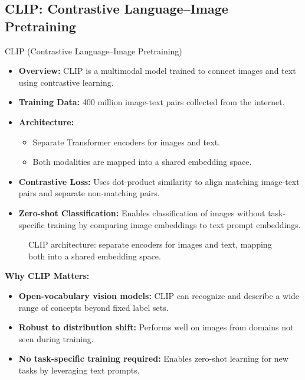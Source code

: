 \subsection{CLIP: Contrastive Language–Image Pretraining}
\begin{frame}[allowframebreaks]{CLIP (Contrastive Language–Image Pretraining)}
    \begin{itemize}
        \item \textbf{Overview:} CLIP is a multimodal model trained to connect images and text using contrastive learning.
        \item \textbf{Training Data:} 400 million image-text pairs collected from the internet.
        \item \textbf{Architecture:}
        \begin{itemize}
            \item Separate Transformer encoders for images and text.
            \item Both modalities are mapped into a shared embedding space.
        \end{itemize}
        \item \textbf{Contrastive Loss:} Uses dot-product similarity to align matching image-text pairs and separate non-matching pairs.
        \item \textbf{Zero-shot Classification:} Enables classification of images without task-specific training by comparing image embeddings to text prompt embeddings.
    \end{itemize}
\framebreak
    \begin{figure}
        \centering
        \caption*{CLIP architecture: separate encoders for images and text, mapping both into a shared embedding space.}
    \end{figure}
\framebreak
    \textbf{Why CLIP Matters:}
        \begin{itemize}
            \item \textbf{Open-vocabulary vision models:} CLIP can recognize and describe a wide range of concepts beyond fixed label sets.
            \item \textbf{Robust to distribution shift:} Performs well on images from domains not seen during training.
            \item \textbf{No task-specific training required:} Enables zero-shot learning for new tasks by leveraging text prompts.

\end{itemize}
\end{frame}
